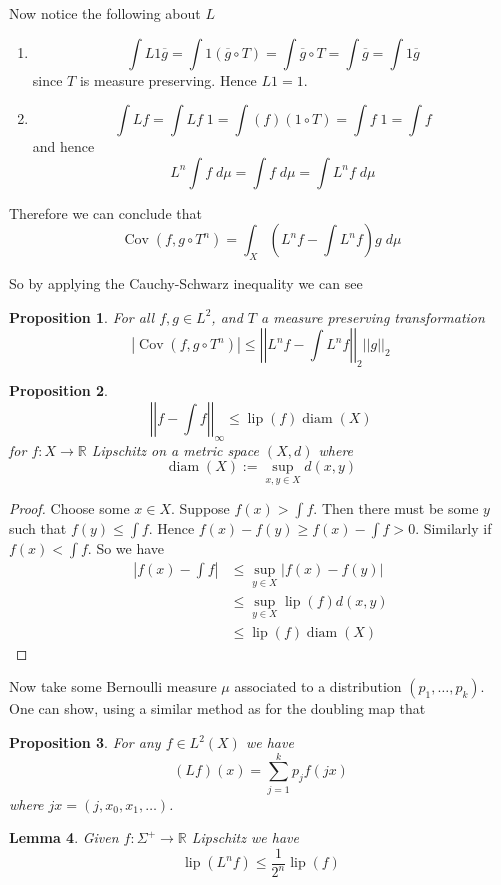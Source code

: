 \documentclass[11pt]{article}
\newcommand{\defeq}{:=}
\newcommand{\abs}[1]{\left|#1\right|}
\newcommand{\norm}[1]{\left|\left|#1\right|\right|}
\newcommand{\R}{\mathbb{R}}
\DeclareMathOperator{\Cov}{\mathrm{Cov}}
\DeclareMathOperator{\lip}{\mathrm{lip}}
\DeclareMathOperator{\diam}{\mathrm{diam}}
\newcommand{\dm}{\;d\mu}
\newtheorem{prop}{Proposition}[section]
\newtheorem{lemma}[prop]{Lemma}
\begin{document}
Now notice the following about $L$
\begin{enumerate}
	\item \[
			\int L 1 \overline{g} = \int 1 \left( \overline{g}\circ T\right) = \int \overline{g}\circ T = \int \overline{g} = \int 1\overline{g}
		\]
		since $T$ is measure preserving.
		Hence $L1 = 1$.
	\item \[
			\int Lf = \int Lf \; 1 = \int (f)(1 \circ T) = \int f\; 1 = \int f
		\]
		and hence
		\[
L^n\int f \dm = \int f \dm = \int L^n f \dm
		\]
\end{enumerate}
Therefore we can conclude that
\[
	\Cov (f, g \circ T^n) = \int_X\left( L^n f - \int L^n f \right)g \dm
\]

So by applying the Cauchy-Schwarz inequality we can see
\begin{prop}
For all $f, g\in L^2$, and $T$ a measure preserving transformation
\[
	\abs{\Cov(f, g \circ T^n)} \leq \norm{L^n f - \int L^n f}_2 \norm{g}_2
\]
\end{prop}

\begin{prop}
\[
	\norm{f - \int f}_\infty \leq \lip(f) \diam(X)
\]
for $f: X \to \R$ Lipschitz on a metric space $(X, d)$ where
\[
	\diam(X) \defeq \sup_{x, y \in X} d(x, y)
\]
\end{prop}

\begin{proof}
Choose some $x\in X$.
Suppose $f(x) > \int f$.
Then there must be some $y$ such that $f(y) \leq \int f$.
Hence $f(x) - f(y) \geq f(x) - \int f > 0$.
Similarly if $f(x) < \int f$.
So we have
\begin{align*}
	\abs{f(x) - \int f} & \leq \sup_{y\in X} \abs{f(x) - f(y)} \\
						& \leq \sup_{y\in X} \lip(f) d(x, y) \\
						& \leq \lip(f) \diam(X)
\end{align*}
\end{proof}

Now take some Bernoulli measure $\mu$ associated to a distribution $(p_1, \dots , p_k)$.
One can show, using a similar method as for the doubling map that
\begin{prop}
For any $f\in L^2(X)$ we have
\[
	(Lf)(x)= \sum_{j=1}^{k}p_j f(jx)
\]
where $jx = (j, x_0, x_1, \dots )$.
\end{prop}

\begin{lemma}
Given $f:\Sigma^+ \to \R$ Lipschitz we have
\[
	\lip(L^n f) \leq \frac{1}{2^n}\lip(f)
\]
\end{lemma}
\end{document}
